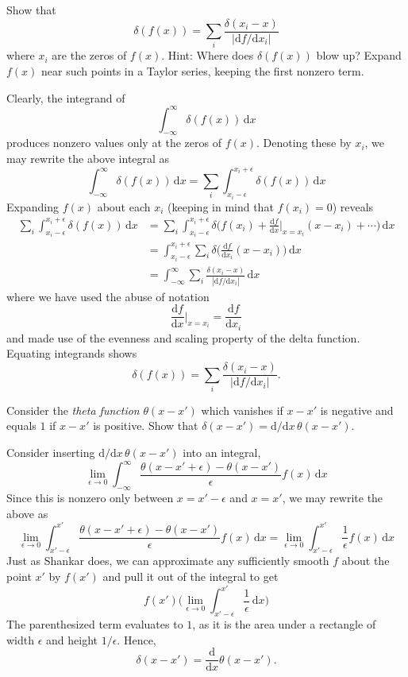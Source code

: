 \documentclass[../principles-of-quantum-mechanics.tex]{subfiles}
\begin{document}
\begin{questions}
\question Show that
\[
	\delta(f(x)) = \sum_i \frac{\delta(x_i - x)}{|\mathrm{d}f/\mathrm{d}x_i|}
\]
where $x_i$ are the zeros of $f(x)$. Hint: Where does $\delta(f(x))$ blow up? Expand $f(x)$ near such points in a Taylor series, keeping the first nonzero term.

\begin{solution}
	Clearly, the integrand of
	\[
		\int_{-\infty}^{\infty}\delta(f(x))\,\mathrm{d}x
	\]
	produces nonzero values only at the zeros of $f(x)$. Denoting these by $x_i$, we may rewrite the above integral as
	\[
		\int_{-\infty}^{\infty}\delta(f(x))\,\mathrm{d}x = \sum_i\int_{x_i-\epsilon}^{x_i+\epsilon}\delta(f(x))\,\mathrm{d}x
	\]
	Expanding $f(x)$ about each $x_i$ (keeping in mind that $f(x_i)=0$) reveals
	\begin{align*}
		\sum_i\int_{x_i-\epsilon}^{x_i+\epsilon}\delta(f(x))\,\mathrm{d}x &= \sum_i\int_{x_i-\epsilon}^{x_i+\epsilon}\delta\Big(f(x_i) + \frac{\mathrm{d}f}{\mathrm{d}x}\Big|_{x=x_i}(x - x_i) + \cdots\Big)\,\mathrm{d}x \\
		&= \int_{x_i-\epsilon}^{x_i+\epsilon}\sum_i\delta\Big(\frac{\mathrm{d}f}{\mathrm{d}x_i}(x - x_i)\Big)\,\mathrm{d}x \\
		&= \int_{-\infty}^{\infty}\sum_i\frac{\delta(x_i - x)}{|\mathrm{d}f/\mathrm{d}x_i|}\,\mathrm{d}x
	\end{align*}
	where we have used the abuse of notation 
	\[
		\frac{\mathrm{d}f}{\mathrm{d}x}\Big|_{x=x_i} = \frac{\mathrm{d}f}{\mathrm{d}x_i}
	\]
	and made use of the evenness and scaling property of the delta function. Equating integrands shows
	\[
	\delta(f(x)) = \sum_i \frac{\delta(x_i - x)}{|\mathrm{d}f/\mathrm{d}x_i|}.
	\]
\end{solution}

\question Consider the \textit{theta function} $\theta(x-x')$ which vanishes if $x-x'$ is negative and equals $1$ if $x-x'$ is positive. Show that $\delta(x - x') = \mathrm{d}/\mathrm{d}x\,\theta(x-x')$.

\begin{solution}
	Consider inserting $\mathrm{d}/\mathrm{d}x\,\theta(x-x')$ into an integral,
	\[
		\lim_{\epsilon\to0}\int_{-\infty}^{\infty}\frac{\theta(x - x' + \epsilon) - \theta(x - x')}{\epsilon}f(x)\,\mathrm{d}x
	\]
	Since this is nonzero only between $x = x' - \epsilon$ and $x = x'$, we may rewrite the above as
	\[
		\lim_{\epsilon\to0}\int_{x' - \epsilon}^{x'}\frac{\theta(x - x' + \epsilon) - \theta(x - x')}{\epsilon}f(x)\,\mathrm{d}x = \lim_{\epsilon\to0}\int_{x'-\epsilon}^{x'}\frac{1}{\epsilon}f(x)\,\mathrm{d}x
	\]
	Just as Shankar does, we can approximate any sufficiently smooth $f$ about the point $x'$ by $f(x')$ and pull it out of the integral to get
	\[
		f(x')\Big(\lim_{\epsilon\to0}\int_{x'-\epsilon}^{x'}\frac{1}{\epsilon}\,\mathrm{d}x\Big)
	\]
	The parenthesized term evaluates to $1$, as it is the area under a rectangle of width $\epsilon$ and height $1/\epsilon$. Hence,
	\[
		\delta(x - x') = \frac{\mathrm{d}}{\mathrm{d}x}\theta(x-x').
	\]
\end{solution}


\end{questions}
\end{document}
